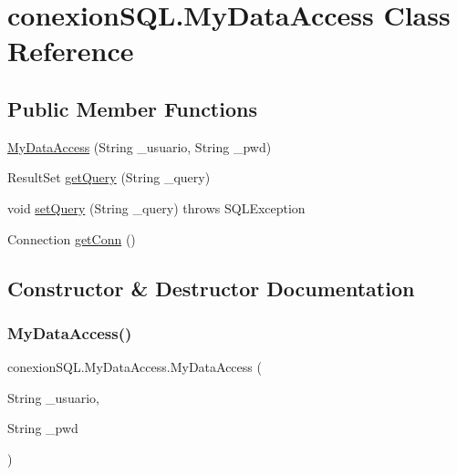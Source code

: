 \hypertarget{classconexion_s_q_l_1_1_my_data_access}{}\section{conexion\+S\+Q\+L.\+My\+Data\+Access Class Reference}
\label{classconexion_s_q_l_1_1_my_data_access}
\subsection*{Public Member Functions}
\begin{DoxyCompactItemize}
\item 
\mbox{\hyperlink{classconexion_s_q_l_1_1_my_data_access_a6c94dfb5301a4653cd0b084149e2d426}{My\+Data\+Access}} (String \+\_\+usuario, String \+\_\+pwd)
\item 
Result\+Set \mbox{\hyperlink{classconexion_s_q_l_1_1_my_data_access_ae8d04039a000d2b3e7dc72c99be7c551}{get\+Query}} (String \+\_\+query)
\item 
void \mbox{\hyperlink{classconexion_s_q_l_1_1_my_data_access_a9c57d53829ea15bb0bc59d7647cc6249}{set\+Query}} (String \+\_\+query)  throws S\+Q\+L\+Exception
\item 
Connection \mbox{\hyperlink{classconexion_s_q_l_1_1_my_data_access_a3317cee8cca3bea96e915daf445e068d}{get\+Conn}} ()
\end{DoxyCompactItemize}


\subsection{Constructor \& Destructor Documentation}
\mbox{\label{classconexion_s_q_l_1_1_my_data_access_a6c94dfb5301a4653cd0b084149e2d426}} 
\subsubsection{\texorpdfstring{My\+Data\+Access()}{MyDataAccess()}}
{\footnotesize\ttfamily conexion\+S\+Q\+L.\+My\+Data\+Access.\+My\+Data\+Access (\begin{DoxyParamCaption}\item[{String}]{\+\_\+usuario,  }\item[{String}]{\+\_\+pwd }\end{DoxyParamCaption})\hspace{0.3cm}{\ttfamily [inline]}}

